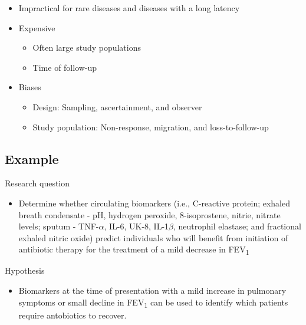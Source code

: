 \documentclass[
]{book}
\providecommand{\tightlist}{%
  \setlength{\itemsep}{0pt}\setlength{\parskip}{0pt}}
\begin{document}
\begin{itemize}
\tightlist
\item
  Impractical for rare diseases and diseases with a long latency
\item
  Expensive

  \begin{itemize}
  \tightlist
  \item
    Often large study populations
  \item
    Time of follow-up
  \end{itemize}
\item
  Biases

  \begin{itemize}
  \tightlist
  \item
    Design: Sampling, ascertainment, and observer
  \item
    Study population: Non-response, migration, and loss-to-follow-up
  \end{itemize}
\end{itemize}

\hypertarget{example-3}{%
\subsection{Example}\label{example-3}}

Research question

\begin{itemize}
\tightlist
\item
  Determine whether circulating biomarkers (i.e., C-reactive protein; exhaled breath condensate - pH, hydrogen peroxide, 8-isoprostene, nitrie, nitrate levels; sputum - TNF-\(\alpha\), IL-6, UK-8, IL-1\(\beta\), neutrophil elastase; and fractional exhaled nitric oxide) predict individuals who will benefit from initiation of antibiotic therapy for the treatment of a mild decrease in FEV\textsubscript{1}
\end{itemize}

Hypothesis

\begin{itemize}
\tightlist
\item
  Biomarkers at the time of presentation with a mild increase in pulmonary symptoms or small decline in FEV\textsubscript{1} can be used to identify which patients require antobiotics to recover.
\end{itemize}
\end{document}
